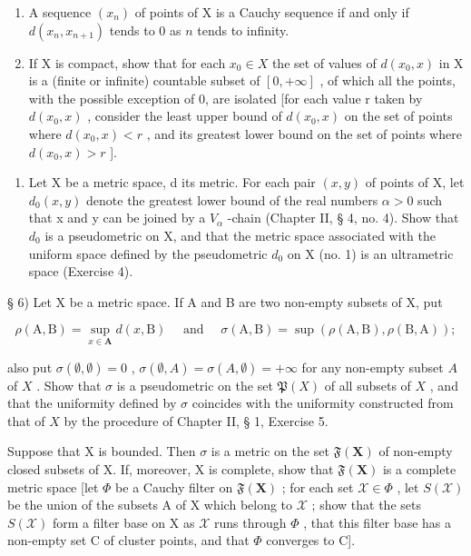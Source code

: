 \begin{enumerate}
\def\labelenumi{\alph{enumi})}
\setcounter{enumi}{4}
\item
  A sequence \((x_{n})\) of points of X is a Cauchy sequence if and only if \(d(x_{n}, x_{n+1})\) tends to 0 as \(n\) tends to infinity.
\item
  If X is compact, show that for each \(x_{0} \in X\) the set of values of \(d(x_{0}, x)\) in X is a (finite or infinite) countable subset of \([0, +\infty]\) , of which all the points, with the possible exception of 0, are isolated {[}for each value r taken by \(d(x_{0}, x)\) , consider the least upper bound of \(d(x_{0}, x)\) on the set of points where \(d(x_{0}, x) < r\) , and its greatest lower bound on the set of points where \(d(x_{0}, x) > r\) {]}.
\end{enumerate}

\begin{enumerate}
\def\labelenumi{\arabic{enumi})}
\setcounter{enumi}{4}
\tightlist
\item
  Let X be a metric space, d its metric. For each pair \((x, y)\) of points of X, let \(d_{0}(x, y)\) denote the greatest lower bound of the real numbers \(\alpha > 0\) such that x and y can be joined by a \(V_{\alpha}\) -chain (Chapter II, § 4, no. 4). Show that \(d_{0}\) is a pseudometric on X, and that the metric space associated with the uniform space defined by the pseudometric \(d_{0}\) on X (no. 1) is an ultrametric space (Exercise 4).
\end{enumerate}

§ 6) Let X be a metric space. If A and B are two non-empty subsets of X, put

\[
\rho (\mathrm{A}, \mathrm{B}) = \sup _ {x \in \mathbf {A}} d (x, \mathrm{B}) \quad \text { and } \quad \sigma (\mathrm{A}, \mathrm{B}) = \sup \left(\rho (\mathrm{A}, \mathrm{B}), \rho (\mathrm{B}, \mathrm{A})\right);
\]

also put \(\sigma(\emptyset, \emptyset) = 0\) , \(\sigma(\emptyset, A) = \sigma(A, \emptyset) = +\infty\) for any non-empty subset \(A\) of \(X\) . Show that \(\sigma\) is a pseudometric on the set \(\mathfrak{P}(X)\) of all subsets of \(X\) , and that the uniformity defined by \(\sigma\) coincides with the uniformity constructed from that of \(X\) by the procedure of Chapter II, § 1, Exercise 5.

Suppose that X is bounded. Then \(\sigma\) is a metric on the set \(\mathfrak{F}(\mathbf{X})\) of non-empty closed subsets of X. If, moreover, X is complete, show that \(\mathfrak{F}(\mathbf{X})\) is a complete metric space {[}let \(\Phi\) be a Cauchy filter on \(\mathfrak{F}(\mathbf{X})\) ; for each set \(\mathcal{X} \in \Phi\) , let \(S(\mathcal{X})\) be the union of the subsets A of X which belong to \(\mathcal{X}\) ; show that the sets \(S(\mathcal{X})\) form a filter base on X as \(\mathcal{X}\) runs through \(\Phi\) , that this filter base has a non-empty set C of cluster points, and that \(\Phi\) converges to C{]}.

